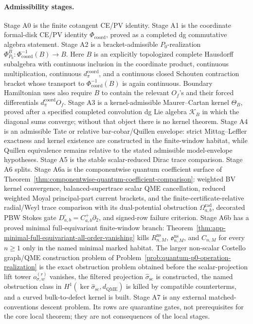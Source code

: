 \paragraph{Admissibility stages.}
Stage A0 is the finite cotangent CE/PV identity.  Stage A1 is the
coordinate formal-disk CE/PV identity \(\Phi_{\mathrm{coord}}\), proved
as a completed dg commutative algebra statement.  Stage A2 is a
bracket-admissible \(P_0\)-realization
\(\Phi^B_{P_0}\colon\Phi_{\mathrm{coord}}^{-1}(B)\to B\).  Here
\(B\) is an explicitly topologized complete Hausdorff subalgebra with
continuous inclusion in the coordinate product, continuous
multiplication, continuous \(d_\pi^{\mathrm{coord}}\), and a continuous
closed Schouten contraction bracket whose transport to
\(\Phi_{\mathrm{coord}}^{-1}(B)\) is again continuous.  Boundary
Hamiltonian uses also require \(B\) to contain the relevant \(O_f\)'s and
their forced differentials \(d_\pi^{\mathrm{coord}}O_f\).  Stage A3 is a
kernel-admissible Maurer--Cartan kernel \(\Theta_B\), proved after a
specified completed convolution dg Lie algebra \(\mathcal K_B\) in which
the diagonal sums converge; without that object there is no kernel
theorem.  Stage A4 is an admissible Tate or relative
bar-cobar/Quillen envelope: strict Mittag--Leffler exactness and kernel
existence are constructed in the finite-window habitat, while Quillen
equivalence remains relative to the stated admissible model-envelope
hypotheses.
Stage A5 is the stable scalar-reduced Dirac trace comparison.  Stage A6
splits.  Stage A6a is the componentwise quantum coefficient surface of
Theorem~\ref{thm:componentwise-quantum-coefficient-comparison}: weighted BV kernel
convergence, balanced-supertrace scalar QME cancellation, reduced
weighted Moyal principal-part current brackets, and the
finite-certificate-relative radial/Weyl trace comparison with its
dual-potential obstruction
\(\Omega^{\mathrm{rad}}_{a,b}\), decorated PBW Stokes gate
\(D^\square_{a,b}=C^+_{a,b}\partial_2\), and signed-row failure
criterion.  Stage A6b
has a proved minimal full-equivariant finite-window branch:
Theorem~\ref{thm:app-minimal-full-equivariant-all-order-vanishing}
kills \(R^{\mathrm{ns}}_{n,M}\),
\(\mathfrak o^{\mathrm{ns}}_{n,M}\), and \(C_{n,M}\) for every
\(n\geq1\) only in the named minimal marked habitat.  The larger
non-scalar Costello graph/QME construction problem of
Problem~\ref{prob:quantum-p0-operation-realization} is the exact
obstruction problem obtained before
the scalar-projection lift tower \(o_{\sigma,w}^{(r)}\) vanishes, the
filtered projection \(\widehat\sigma_{\mathrm{sc}}\) is constructed, the
named obstruction class in
\(H^1(\ker\widehat\sigma_{\mathrm{sc}},d_{\mathrm{QME}})\) is killed by
compatible counterterms, and a curved bulk-to-defect kernel is built.
Stage A7 is any external matched-conventions descent problem.  Its rows
are quarantine gates, not prerequisites for the core local theorem; they
are not consequences of the local stages.

